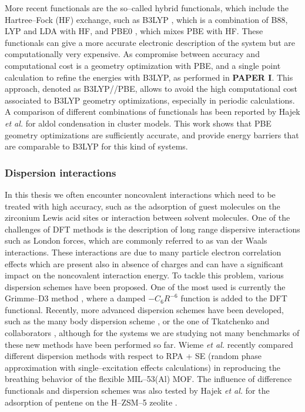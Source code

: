  More recent functionals are the so--called hybrid functionals, which include the Hartree--Fock (HF) exchange, such as B3LYP \cite{Becke1988, Becke1993, Lee1988}, which is a combination of B88, LYP and LDA with HF, and PBE0 \cite{Adamo1999}, which mixes PBE with HF. These functionals can give a more accurate electronic description of the system but are computationally very expensive. As compromise between accuracy and computational cost is a geometry optimization with PBE, and a single point calculation to refine the energies with B3LYP, as performed in \textbf{PAPER I}. This approach, denoted as B3LYP//PBE, allows to avoid the high computational cost associated to B3LYP geometry optimizations, especially in periodic calculations. A comparison of different combinations of functionals has been reported by Hajek \textit{et al.} \cite{hajek2015mechanistic} for aldol condensation in cluster models. This work shows that PBE geometry optimizations are sufficiently accurate, and provide energy barriers that are comparable to B3LYP for this kind of systems.

\subsubsection*{Dispersion interactions}
In this thesis we often encounter noncovalent interactions which need to be treated with high accuracy, such as the adsorption of guest molecules on the zirconium Lewis acid sites or interaction between solvent molecules. One of the challenges of DFT methods is the description of long range dispersive interactions such as London forces, which are commonly referred to as van der Waals interactions. These interactions are due to many particle electron correlation effects which are present also in absence of charges and can have a significant impact on the noncovalent interaction energy. 
To tackle this problem, various dispersion schemes have been proposed. One of the most used is currently the Grimme--D3 method \cite{Grimme2010}, where a damped $-C_{6}R^{-6}$ function is added to the DFT functional. Recently, more advanced dispersion schemes have been developed, such as the many body dispersion scheme \cite{Buko2016}, or the one of Tkatchenko and collaborators \cite{Ambrosetti2014}, although for the systems we are studying not many benchmarks of these new methods have been performed so far. 
Wieme \textit{et al.} \cite{wieme2018tuning} recently compared different dispersion methods with respect to RPA + SE (random phase approximation with single--excitation effects calculations) in reproducing the breathing behavior of the flexible MIL--53(Al) MOF. The influence of difference functionals and dispersion schemes was also tested by Hajek \textit{et al.} for the adsorption of pentene on the H--ZSM--5 zeolite \cite{hajek2016stability}.

